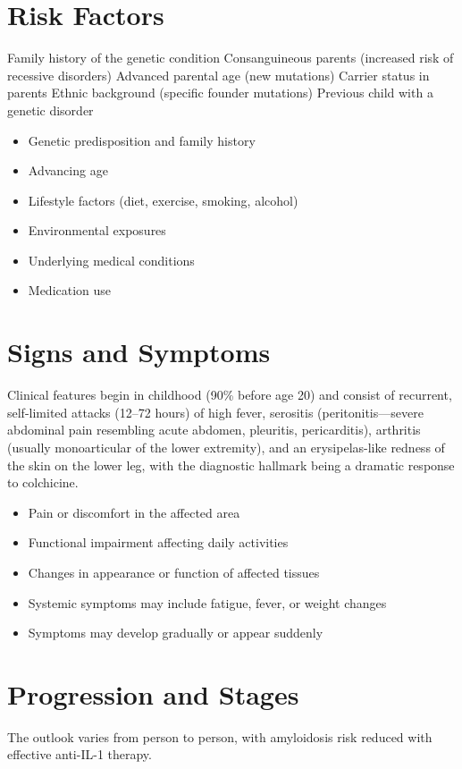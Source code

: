 \section{Risk Factors}
Family history of the genetic condition Consanguineous parents (increased risk of recessive disorders) Advanced parental age (new mutations) Carrier status in parents Ethnic background (specific founder mutations) Previous child with a genetic disorder

\begin{itemize}[noitemsep]
  \item Genetic predisposition and family history
  \item Advancing age
  \item Lifestyle factors (diet, exercise, smoking, alcohol)
  \item Environmental exposures
  \item Underlying medical conditions
  \item Medication use
\end{itemize}
\section{Signs and Symptoms}
Clinical features begin in childhood (90\% before age 20) and consist of recurrent, self-limited attacks (12--72 hours) of high fever, serositis (peritonitis---severe abdominal pain resembling acute abdomen, pleuritis, pericarditis), arthritis (usually monoarticular of the lower extremity), and an erysipelas-like redness of the skin on the lower leg, with the diagnostic hallmark being a dramatic response to colchicine.

\begin{itemize}[noitemsep]
  \item Pain or discomfort in the affected area
  \item Functional impairment affecting daily activities
  \item Changes in appearance or function of affected tissues
  \item Systemic symptoms may include fatigue, fever, or weight changes
  \item Symptoms may develop gradually or appear suddenly
\end{itemize}
\section{Progression and Stages}
The outlook varies from person to person, with amyloidosis risk reduced with effective anti-IL-1 therapy.

